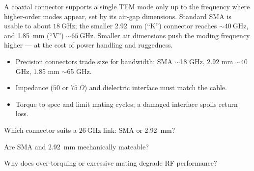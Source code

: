 \begin{workedexample}
A coaxial connector supports a single TEM mode only up to the frequency
where higher-order modes appear, set by its air-gap dimensions. Standard SMA is
usable to about $18\ \text{GHz}$; the smaller 2.92~mm (``K'') connector reaches
$\sim40\ \text{GHz}$, and 1.85~mm (``V'') $\sim65\ \text{GHz}$. Smaller air
dimensions push the moding frequency higher --- at the cost of power handling
and ruggedness.
\end{workedexample}

\begin{keytakeaways}
\begin{itemize}[leftmargin=1.4em,itemsep=2pt]
\item Precision connectors trade size for bandwidth: SMA $\sim$18 GHz, 2.92 mm $\sim$40 GHz, 1.85 mm $\sim$65 GHz.
\item Impedance ($50$ or $75\ \Omega$) and dielectric interface must match the cable.
\item Torque to spec and limit mating cycles; a damaged interface spoils return loss.
\end{itemize}
\end{keytakeaways}

\begin{exercises}
\item Which connector suits a $26\ \text{GHz}$ link: SMA or 2.92~mm?
\item Are SMA and 2.92~mm mechanically mateable?
\item Why does over-torquing or excessive mating degrade RF performance?
\end{exercises}

